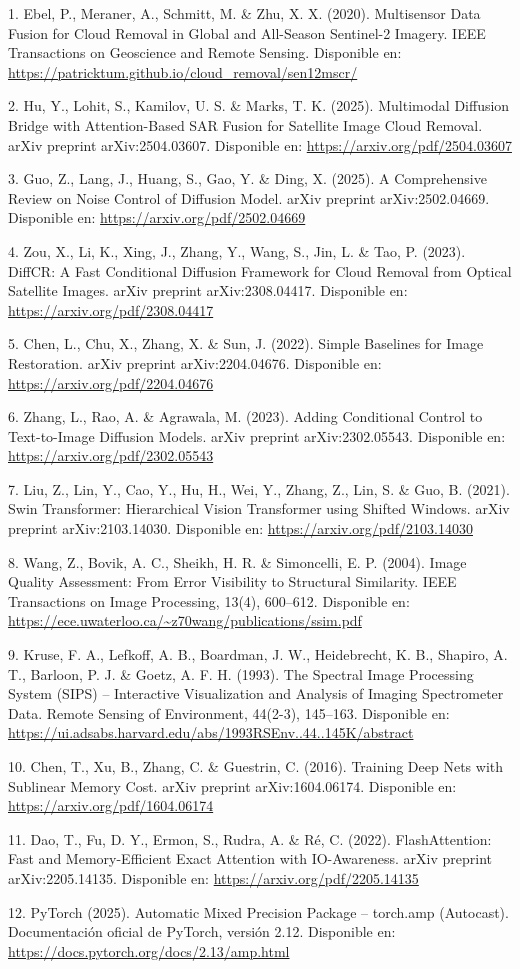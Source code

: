 1. Ebel, P., Meraner, A., Schmitt, M. \& Zhu, X. X. (2020). Multisensor Data Fusion for Cloud Removal in Global and All-Season Sentinel-2 Imagery. IEEE Transactions on Geoscience and Remote Sensing. Disponible en: \url{https://patricktum.github.io/cloud_removal/sen12mscr/}

2. Hu, Y., Lohit, S., Kamilov, U. S. \& Marks, T. K. (2025). Multimodal Diffusion Bridge with Attention-Based SAR Fusion for Satellite Image Cloud Removal. arXiv preprint arXiv:2504.03607. Disponible en: \url{https://arxiv.org/pdf/2504.03607}

3. Guo, Z., Lang, J., Huang, S., Gao, Y. \& Ding, X. (2025). A Comprehensive Review on Noise Control of Diffusion Model. arXiv preprint arXiv:2502.04669. Disponible en: \url{https://arxiv.org/pdf/2502.04669}

4. Zou, X., Li, K., Xing, J., Zhang, Y., Wang, S., Jin, L. \& Tao, P. (2023). DiffCR: A Fast Conditional Diffusion Framework for Cloud Removal from Optical Satellite Images. arXiv preprint arXiv:2308.04417. Disponible en: \url{https://arxiv.org/pdf/2308.04417}

5. Chen, L., Chu, X., Zhang, X. \& Sun, J. (2022). Simple Baselines for Image Restoration. arXiv preprint arXiv:2204.04676. Disponible en: \url{https://arxiv.org/pdf/2204.04676}

6. Zhang, L., Rao, A. \& Agrawala, M. (2023). Adding Conditional Control to Text-to-Image Diffusion Models. arXiv preprint arXiv:2302.05543. Disponible en: \url{https://arxiv.org/pdf/2302.05543}

7. Liu, Z., Lin, Y., Cao, Y., Hu, H., Wei, Y., Zhang, Z., Lin, S. \& Guo, B. (2021). Swin Transformer: Hierarchical Vision Transformer using Shifted Windows. arXiv preprint arXiv:2103.14030. Disponible en: \url{https://arxiv.org/pdf/2103.14030}

8. Wang, Z., Bovik, A. C., Sheikh, H. R. \& Simoncelli, E. P. (2004). Image Quality Assessment: From Error Visibility to Structural Similarity. IEEE Transactions on Image Processing, 13(4), 600--612. Disponible en: \url{https://ece.uwaterloo.ca/~z70wang/publications/ssim.pdf}

9. Kruse, F. A., Lefkoff, A. B., Boardman, J. W., Heidebrecht, K. B., Shapiro, A. T., Barloon, P. J. \& Goetz, A. F. H. (1993). The Spectral Image Processing System (SIPS) -- Interactive Visualization and Analysis of Imaging Spectrometer Data. Remote Sensing of Environment, 44(2-3), 145--163. Disponible en: \url{https://ui.adsabs.harvard.edu/abs/1993RSEnv..44..145K/abstract}

10. Chen, T., Xu, B., Zhang, C. \& Guestrin, C. (2016). Training Deep Nets with Sublinear Memory Cost. arXiv preprint arXiv:1604.06174. Disponible en: \url{https://arxiv.org/pdf/1604.06174}

11. Dao, T., Fu, D. Y., Ermon, S., Rudra, A. \& Ré, C. (2022). FlashAttention: Fast and Memory-Efficient Exact Attention with IO-Awareness. arXiv preprint arXiv:2205.14135. Disponible en: \url{https://arxiv.org/pdf/2205.14135}

12. PyTorch (2025). Automatic Mixed Precision Package -- torch.amp (Autocast). Documentación oficial de PyTorch, versión 2.12. Disponible en: \url{https://docs.pytorch.org/docs/2.13/amp.html}